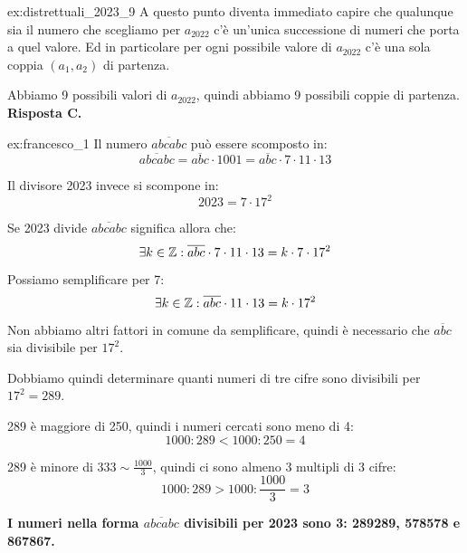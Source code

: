\begin{soluzione}{ex:distrettuali_2023_9}
    A questo punto diventa immediato capire che qualunque sia il numero che scegliamo per $a_{2022}$ c'è un'unica
    successione di numeri che porta a quel valore.
    Ed in particolare per ogni possibile valore di $a_{2022}$ c'è una sola coppia $(a_1, a_2)$ di partenza.

    Abbiamo 9 possibili valori di $a_{2022}$, quindi abbiamo 9 possibili coppie di partenza. \textbf{Risposta C.}

\end{soluzione}

\begin{soluzione}{ex:francesco_1}
    Il numero $\overline{abcabc}$ può essere scomposto in:
    \begin{equation*}
        \overline{abcabc} = \overline{abc} \cdot 1001 = \overline{abc} \cdot 7 \cdot 11 \cdot 13
    \end{equation*}

    Il divisore 2023 invece si scompone in:
    \begin{equation*}
        2023 = 7 \cdot 17^2
    \end{equation*}

    Se 2023 divide $\overline{abcabc}$ significa allora che:
    \begin{equation*}
        \exists k \in  \mathbb{Z} : \overline{abc} \cdot 7 \cdot 11 \cdot 13 = k \cdot 7 \cdot 17^2
    \end{equation*}

    Possiamo semplificare per 7:
    \begin{equation*}
        \exists k \in  \mathbb{Z} : \overline{abc} \cdot 11 \cdot 13 = k \cdot 17^2
    \end{equation*}

    Non abbiamo altri fattori in comune da semplificare, quindi è necessario che $\overline{abc}$ sia divisibile per
    $17^2$.

    Dobbiamo quindi determinare quanti numeri di tre cifre sono divisibili per $17^2 = 289$.

    289 è maggiore di 250, quindi i numeri cercati sono meno di 4:
    \begin{equation*}
        1000 : 289 < 1000 : 250 = 4
    \end{equation*}

    289 è minore di $333 \sim \frac{1000}{3}$, quindi ci sono almeno 3 multipli di 3 cifre:
    \begin{equation*}
        1000 : 289 > 1000 : \frac{1000}{3} = 3
    \end{equation*}

    \bigskip
    \textbf{I numeri nella forma $\overline{abcabc}$ divisibili per 2023 sono 3: 289289, 578578 e 867867.}
\end{soluzione}


